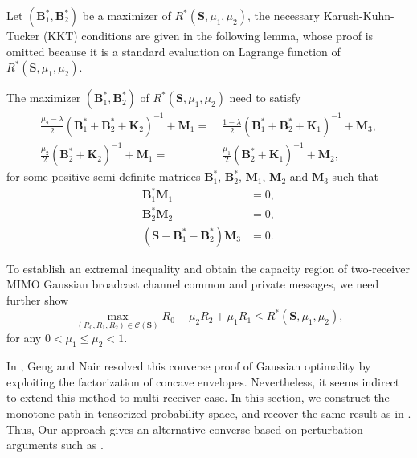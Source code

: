 \documentclass[journal,final, onecolumn]{IEEEtran}
\begin{document}
Let $\left(\boldsymbol{B}^{*}_{1}, \boldsymbol{B}^{*}_{2}\right)$ be a maximizer of $R^{*}(\boldsymbol{S}, \mu_1, \mu_2)$, the necessary Karush-Kuhn-Tucker (KKT) conditions are given in the following lemma, whose proof is omitted because it is a standard evaluation on Lagrange function of $R^{*}(\boldsymbol{S}, \mu_1, \mu_2)$.
\begin{lemma}\label{lemma_KKT1}
The maximizer $\left(\boldsymbol{B}^{*}_{1}, \boldsymbol{B}^{*}_{2}\right)$ of $R^{*}(\boldsymbol{S}, \mu_1, \mu_2)$ need to satisfy
\begin{align}
\frac{\mu_{2}-\lambda}{2}(\boldsymbol{B}_{1}^{*}  + \boldsymbol{B}_{2}^{*} + \boldsymbol{K}_{2})^{-1} + \boldsymbol{M}_{1}
=& \; \frac{1-\lambda}{2} (\boldsymbol{B}_{1}^{*} + \boldsymbol{B}_{2}^{*} + \boldsymbol{K}_{1})^{-1}+\boldsymbol{M}_{3},  \label{KKT_eq1}\\
\frac{\mu_{2}}{2} (\boldsymbol{B}_{2}^{*} + \boldsymbol{K}_{2})^{-1} + \boldsymbol{M}_{1}
=& \; \frac{\mu_{1}}{2} ( \boldsymbol{B}_{2}^{*} + \boldsymbol{K}_{1})^{-1} + \boldsymbol{M}_{2},\label{KKT_eq2}
\end{align}
for some positive semi-definite matrices $\boldsymbol{B}_{1}^{*}$, $\boldsymbol{B}_{2}^{*}$, $\boldsymbol{M}_{1}$, $\boldsymbol{M}_{2}$ and $\boldsymbol{M}_{3}$ such that
\begin{align}
\boldsymbol{B}_{1}^{*}\boldsymbol{M}_{1} &= 0,\\
\boldsymbol{B}_{2}^{*} \boldsymbol{M}_{2}&=0,\\
\left(\boldsymbol{S}-\boldsymbol{B}_{1}^{*}-\boldsymbol{B}_{2}^{*}\right)\boldsymbol{M}_{3}&=0.
\end{align}
\end{lemma}
To establish an extremal inequality and obtain the capacity region of two-receiver MIMO Gaussian broadcast channel common and private messages, we need further show
\begin{equation}
\max_{(R_{0},R_{1}, R_{2}) \in \mathcal{C}(\mathbf{S})} R_{0} + \mu_{2}R_{2} + \mu_{1} R_{1} \leq R^{*}(\boldsymbol{S}, \mu_1, \mu_2),
\end{equation}
for any $0 < \mu_{1} \leq \mu_{2}  < 1 $.

In \cite{GN14}, Geng and Nair resolved this converse proof of Gaussian optimality by exploiting the factorization of concave envelopes. Nevertheless, it seems indirect to extend this method to multi-receiver case. In this section, we construct the monotone path in tensorized probability space, and recover the same result as in \cite{GN14}. Thus, Our approach gives an alternative converse based on perturbation arguments such as \cite{LV07}.
\end{document}
